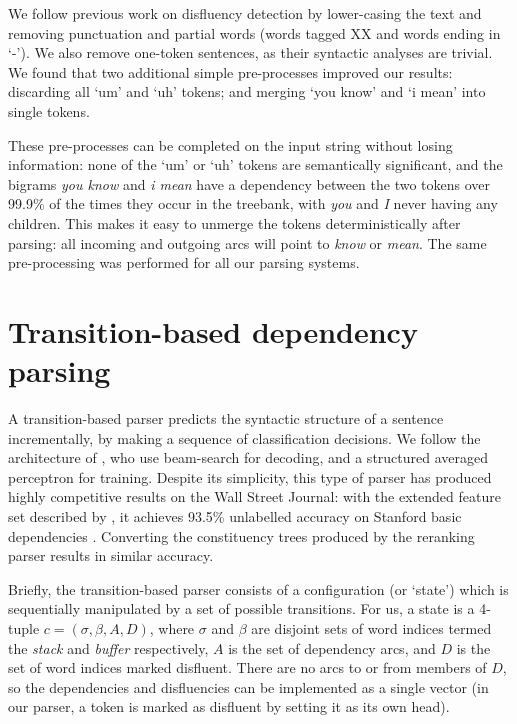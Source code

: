 \documentclass[11pt,letterpaper]{article}
\begin{document}
We follow previous work on disfluency detection by lower-casing the text and
removing punctuation and partial words (words tagged XX and words ending in
`-').  We also remove one-token sentences, as their syntactic
analyses are trivial.
We found that two additional simple pre-processes improved our results: discarding
all `um' and `uh' tokens; and merging `you know' and `i mean' into single tokens.

These pre-processes can be completed on the input string without losing information:
none of the `um' or `uh' tokens are semantically significant, and
the bigrams \emph{you know} and \emph{i mean} have a dependency between the two
tokens over 99.9\% of the times they occur in the treebank, with \emph{you} and \emph{I}
never having any children. This makes it easy to unmerge the tokens deterministically
after parsing:
all incoming and outgoing arcs will point to \emph{know} or \emph{mean}.
The same pre-processing was performed for all our parsing systems.

\section{Transition-based dependency parsing}

A transition-based parser predicts the syntactic structure of a sentence incrementally,
by making a sequence of classification decisions.  We follow the architecture of
\citet{zhang:cl11}, who use beam-search for decoding, and a structured averaged
perceptron for training.  Despite its simplicity, this type of parser
has produced highly competitive results on the Wall Street Journal: with the
extended feature set described by \citet{zhang:11}, it achieves 93.5\%
unlabelled accuracy on Stanford basic dependencies \citep{stanford_deps}.  Converting
the constituency trees produced by the \citet{Charniak05a} reranking parser
results in similar accuracy.

Briefly, the transition-based parser consists of a configuration (or `state') which
is sequentially manipulated by a set of possible transitions. For us, a state is a 4-tuple
$c = (\sigma, \beta, A, D)$, where $\sigma$ and $\beta$ are disjoint sets of word
indices termed the \emph{stack} and \emph{buffer} respectively, $A$ is the set of
dependency arcs, and $D$ is the set of word indices marked disfluent.  There are no
arcs to or from members of $D$, so the dependencies and disfluencies can be
implemented as a single vector (in our parser, a token is marked as disfluent
by setting it as its own head).
\end{document}
